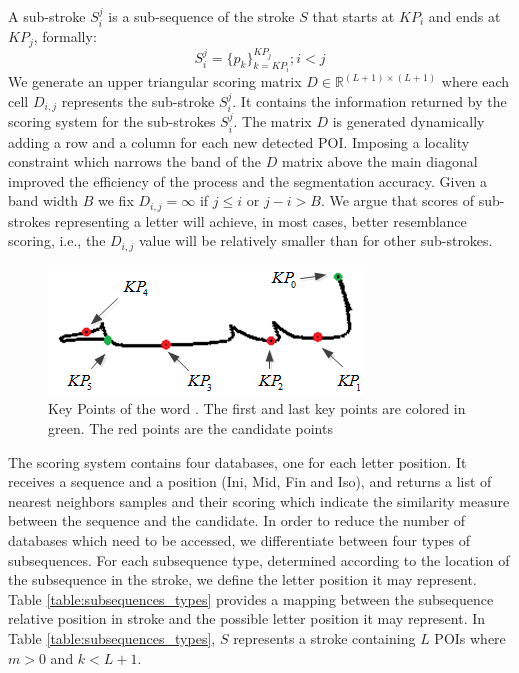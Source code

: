 \documentclass[10pt, conference, compsocconf]{IEEEtran}
\begin{document}
A sub-stroke $S_{i}^{j}$ is a sub-sequence of the stroke $S$ that starts at $KP_{i}$ and ends at $KP_{j}$, formally:
\begin{equation}
S_{i}^{j}=\{p_{k}\}_{k=KP_{i}}^{KP_{j}}; i<j
\end{equation}
We generate an upper triangular scoring matrix $D\in\mathbb{R}^{(L+1)\times (L+1)}$ where each cell $D_{i,j}$ represents the sub-stroke $S_i^j$. It contains the information returned by the scoring system for the sub-strokes $S_i^j$. 
The matrix $D$ is generated dynamically adding a row and a column for each new detected POI. 
Imposing a locality constraint which narrows the band of the $D$ matrix above the main diagonal improved the efficiency of the process and the segmentation accuracy. 
Given a band width $B$ we fix $D_{i,j}=\infty$ if  $j \leq i$ or $j-i>B$.
We argue that scores of sub-strokes representing a letter will achieve, in most cases, better resemblance scoring, i.e., the $D_{i,j}$ value will be relatively smaller than for other sub-strokes.\\

\begin{figure}
\centering
\includegraphics[width=0.5\columnwidth]{./figures/candidate_points}
\caption{Key Points of the word . The first and last key points are colored in green. The red points are the candidate points}
\label{fig:candidate_points}
\end{figure}

The scoring system contains four databases, one for each letter position. 
It receives a sequence and a position (Ini, Mid, Fin and Iso), and returns a list of nearest neighbors samples and their scoring which indicate the similarity measure between the sequence and the candidate.
In order to reduce the number of databases which need to be accessed, we differentiate between four types of subsequences.
For each subsequence type, determined according to the location of the subsequence in the stroke, we define the letter position it may represent. 
Table \ref{table:subsequences_types} provides a mapping between the subsequence relative position in stroke and the possible letter position it may represent. In Table \ref{table:subsequences_types}, $S$ represents a stroke containing $L$ POIs where $m>0$ and $k<L+1$.\\
\end{document}
